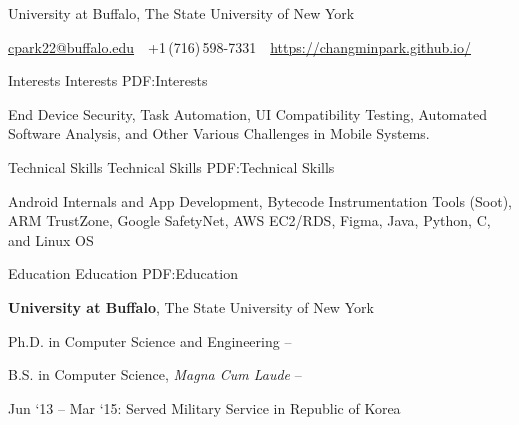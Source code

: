 \documentclass[letterpaper,MMMyyyy,nonstopmode]{simpleresumecv}
\newcommand{\CVAuthor}{Chang Min Park}
\newcommand{\CVWebpage}{https://changminpark.github.io/}
\begin{document}

\Title{\CVAuthor}

\begin{SubTitle}
University at Buffalo, The State University of New York
\par
\href{mailto:cpark22@buffalo.edu}
{cpark22@buffalo.edu}
\,\SubBulletSymbol\,
+1\,(716)\,598-7331
\,\SubBulletSymbol\,
\href{\CVWebpage}
{\url{\CVWebpage}}
\end{SubTitle}

\begin{Body}

\vspace{-0.7ex}
\Section
{Interests}
{Interests}
{PDF:Interests}

\Entry
End Device Security, Task Automation, UI Compatibility Testing, 
Automated Software Analysis, and Other Various Challenges in Mobile Systems.

\vspace{-0.7ex}
\Section
{Technical Skills}
{Technical Skills}
{PDF:Technical Skills}

\Entry
Android Internals and App Development, Bytecode Instrumentation Tools (Soot),
ARM TrustZone, Google SafetyNet, AWS EC2/RDS, Figma, Java, Python, C, and Linux OS

\vspace{-0.7ex}
\Section
{Education}
{Education}
{PDF:Education}

\Entry
\textbf{University at Buffalo}, The State University of New York

\Gap
\BulletItem
Ph.D. in Computer Science and Engineering
\hfill
{} --

\Gap
\BulletItem
B.S. in Computer Science, \textit{Magna Cum Laude}
\hfill
{} --
\begin{Detail}
\SubBulletItem
Jun `13 -- Mar `15: Served Military Service in Republic of Korea
\end{Detail}




\end{Body}
\end{document}
